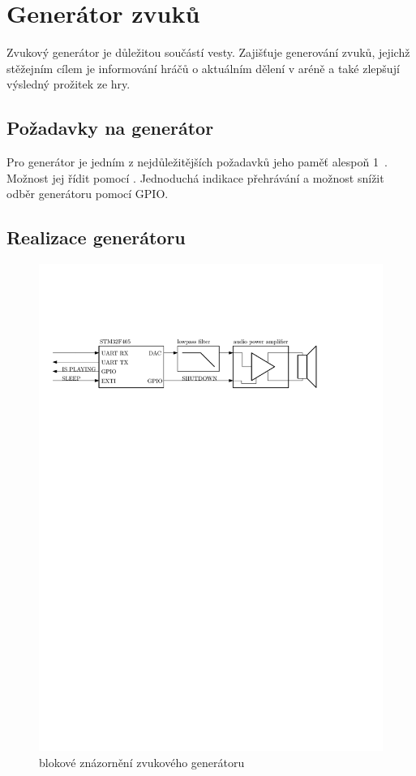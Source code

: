 \section{Generátor zvuků}
Zvukový generátor je důležitou součástí  vesty. Zajišťuje generování zvuků, jejichž stěžejním cílem je informování hráčů o aktuálním dělení v aréně a také zlepšují výsledný prožitek ze hry.

\subsection{Požadavky na generátor}
Pro generátor je jedním z nejdůležitějších požadavků jeho paměť alespoň 1~. Možnost jej řídit pomocí . Jednoduchá indikace přehrávání a možnost snížit odběr generátoru pomocí GPIO.

\subsection{Realizace generátoru}
\begin{figure}[H]
    \begin{center}
        \includegraphics[width=\textwidth]{img/sound-system}
    \end{center}
    \caption{blokové znázornění zvukového generátoru}
\end{figure}

